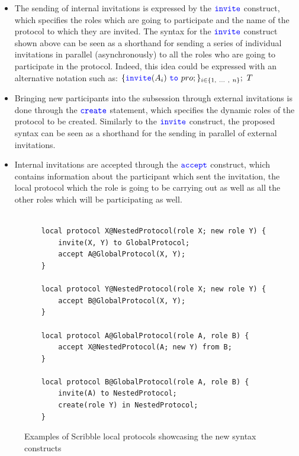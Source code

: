 \documentclass[12pt,twoside]{report}
\begin{document}
\begin{itemize}
    \item The sending of internal invitations is expressed by the ${\color{blue}\mathtt{invite}}$ construct, which specifies the roles which are going to participate and the name of the protocol to which they are invited. The syntax for the ${\color{blue}\mathtt{invite}}$ construct shown above can be seen as a shorthand for sending a series of individual invitations in parallel (asynchronously) to all the roles who are going to participate in the protocol. Indeed, this idea could be expressed with an alternative notation such as:
    $\{\invite(A_i)\ \scrto\ pro;\}_{i \in \{1,\ ...\ ,\ n\}};\ T$

    \item Bringing new participants into the subsession through external invitations is done through the ${\color{blue}\mathtt{create}}$ statement, which specifies the dynamic roles of the protocol to be created. Similarly to the ${\color{blue}\mathtt{invite}}$ construct, the proposed syntax can be seen as a shorthand for the sending in parallel of external invitations.
    
    \item Internal invitations are accepted through the ${\color{blue}\mathtt{accept}}$ construct, which contains information about the participant which sent the invitation, the local protocol which the role is going to be carrying out as well as all the other roles which will be participating as well.
\end{itemize}

\begin{figure}[htb!]
    \centering
    \lstset{language=Scribble}
    \begin{lstlisting}
    
    local protocol X@NestedProtocol(role X; new role Y) {
        invite(X, Y) to GlobalProtocol;
        accept A@GlobalProtocol(X, Y);
    }

    local protocol Y@NestedProtocol(role X; new role Y) {
        accept B@GlobalProtocol(X, Y);
    }
    
    local protocol A@GlobalProtocol(role A, role B) {
        accept X@NestedProtocol(A; new Y) from B;
    }

    local protocol B@GlobalProtocol(role A, role B) {
        invite(A) to NestedProtocol;
        create(role Y) in NestedProtocol;
    }
    \end{lstlisting}
    \caption{Examples of Scribble local protocols showcasing the new syntax constructs}
    \label{scribble-nested-local}
\end{figure}{}
\end{document}
